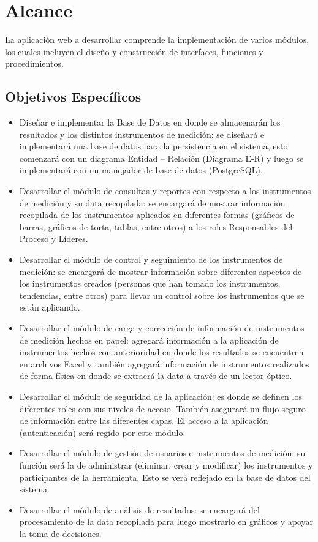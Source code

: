 \chapter{Alcance}
La aplicación web a desarrollar comprende la implementación de varios módulos, los cuales incluyen el diseño y construcción de interfaces, funciones y procedimientos.

\section{Objetivos Específicos}
\begin{itemize}
\item Diseñar e implementar la Base de Datos en donde se almacenarán los resultados y los distintos instrumentos de medición: se diseñará e implementará una base de datos para la persistencia en el sistema, esto comenzará con un diagrama Entidad – Relación (Diagrama E-R) y luego se implementará con un manejador de base de datos (PostgreSQL).

\item Desarrollar el módulo de consultas y reportes con respecto a los instrumentos de medición y su data recopilada: se encargará de mostrar información recopilada de los instrumentos aplicados en diferentes formas (gráficos de barras, gráficos de torta, tablas, entre otros) a los roles Responsables del Proceso y Líderes.

\item Desarrollar el módulo de control y seguimiento de los instrumentos de medición: se encargará de mostrar información sobre diferentes aspectos de los instrumentos creados (personas que han tomado los instrumentos, tendencias, entre otros) para llevar un control sobre los instrumentos que se están aplicando.

\item Desarrollar el módulo de carga y corrección de información de instrumentos de medición hechos en papel: agregará información a la aplicación de instrumentos hechos con anterioridad en donde los resultados se encuentren en archivos Excel y también agregará información de instrumentos realizados de forma física en donde se extraerá la data a través de un lector óptico.

\item Desarrollar el módulo de seguridad de la aplicación: es donde se definen los diferentes roles con sus niveles de acceso. También asegurará un flujo seguro de información entre las diferentes capas. El acceso a la aplicación (autenticación) será regido por este módulo.

\item Desarrollar el módulo de gestión de usuarios e instrumentos de medición: su función será la de administrar (eliminar, crear y modificar) los instrumentos y participantes de la herramienta. Esto se verá reflejado en la base de datos del sistema.

\item Desarrollar el módulo de análisis de resultados: se encargará del procesamiento de la data recopilada para luego mostrarlo en gráficos y apoyar la toma de decisiones.
\end{itemize}

